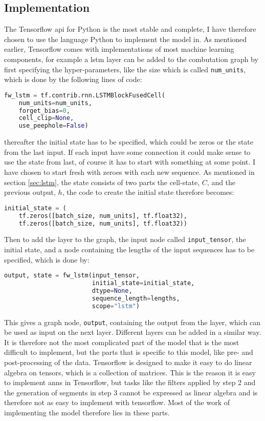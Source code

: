 \subsection{Implementation}
The Tensorflow api for Python is the most stable and complete, I have therefore chosen to use 
the language Python to implement the model in. As mentioned earlier, Tensorflow comes with 
implementations of most machine learning components, for example a \gls{lstm} layer can 
be added to the combutation graph by first specifying the hyper-parameters, like the size
which is called \texttt{num\_units}, which is done by the following lines of code:

\begin{lstlisting}[language=Python]
fw_lstm = tf.contrib.rnn.LSTMBlockFusedCell(
    num_units=num_units,
    forget_bias=0,
    cell_clip=None,
    use_peephole=False)
\end{lstlisting}

thereafter the initial state has to be specified, which could be zeros or the state from the last 
input. If each input have some connection it could make sense to use the state from last, 
of course it has to start with something at some point. I have chosen to start fresh with zeroes 
with each new sequence. As mentioned in section \ref{sec:lstm}, the state consists of two parts
the cell-state, $C$, and the previous output, $h$, the code to create the initial state therefore 
becomes:

\begin{lstlisting}[language=Python]
initial_state = (
    tf.zeros([batch_size, num_units], tf.float32),
    tf.zeros([batch_size, num_units], tf.float32))
\end{lstlisting}

Then to add the layer to the graph, the input node called \texttt{input\_tensor}, the initial state, 
and a node containing the lengths of the input sequences has to be specified, which is done by:

\begin{lstlisting}[language=Python]
output, state = fw_lstm(input_tensor,
                        initial_state=initial_state,
                        dtype=None,
                        sequence_length=lengths,
                        scope="lstm")
\end{lstlisting}

This gives a graph node, \texttt{output}, containing the output from the  layer, which can be used
as input on the next layer. Different layers can be added in a similar way. It is therefore not 
the most complicated part of the model that is the most difficult to implement, but the parts
that is specific to this model, like pre- and post-processing of the data. Tensorflow is designed 
to make it easy to do linear algebra on tensors, which is a collection of matrices. This is the 
reason it is easy to implement \glspl{ann} in Tensorflow, but tasks like the filters applied by 
step 2 and the generation of segments in step 3 cannot be expressed as linear algebra and is 
therefore not as easy to implement with tensorflow. Most of the work of implementing the model
therefore lies in these parts. 

